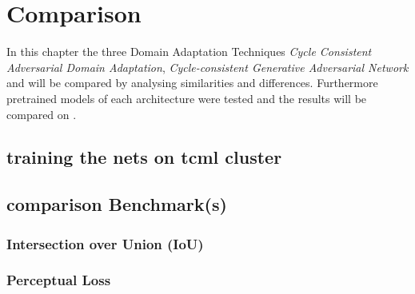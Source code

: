 \chapter{Comparison}
\label{sec:comparison}

In this chapter the three Domain Adaptation Techniques \textit{Cycle Consistent Adversarial Domain Adaptation}, \textit{Cycle-consistent Generative Adversarial Network} and  will be compared by analysing similarities and differences. Furthermore pretrained models of each architecture were tested and the results will be compared on .

\section{training the nets on tcml cluster} 

\section{comparison Benchmark(s)}
\subsection{Intersection over Union (IoU)}

\subsection{Perceptual Loss}

